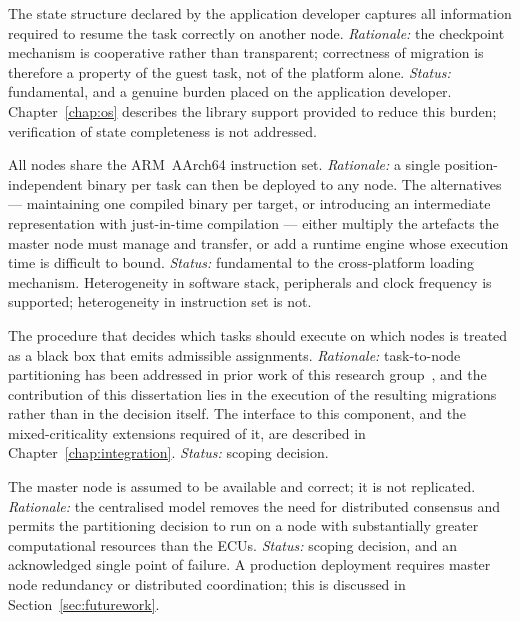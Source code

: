 \begin{description}
	The state structure declared by the application developer captures all
	information required to resume the task correctly on another node.
	\emph{Rationale:} the checkpoint mechanism is cooperative rather than
	transparent; correctness of migration is therefore a property of the guest
	task, not of the platform alone.
	\emph{Status:} fundamental, and a genuine burden placed on the application
	developer. Chapter~\ref{chap:os} describes the library support provided to
	reduce this burden; verification of state completeness is not addressed.
	
	All nodes share the ARM~AArch64 instruction set.
	\emph{Rationale:} a single position-independent binary per task can then be
	deployed to any node. The alternatives --- maintaining one compiled binary
	per target, or introducing an intermediate representation with
	just-in-time compilation --- either multiply the artefacts the
	master node must manage and transfer, or add a runtime engine whose
	execution time is difficult to bound.
	\emph{Status:} fundamental to the cross-platform loading mechanism.
	Heterogeneity in software stack, peripherals and clock frequency is
	supported; heterogeneity in instruction set is not.
	
	The procedure that decides which tasks should execute on which nodes is
	treated as a black box that emits admissible assignments.
	\emph{Rationale:} task-to-node partitioning has been addressed in prior
	work of this research group~\parencite{delgadillo_jlpea22, blieninger1},
	and the contribution of this dissertation lies in the execution of the
	resulting migrations rather than in the decision itself. The interface to
	this component, and the mixed-criticality extensions required of it, are
	described in Chapter~\ref{chap:integration}.
	\emph{Status:} scoping decision.
	
	The master node is assumed to be available and correct; it is not
	replicated.
	\emph{Rationale:} the centralised model removes the need for distributed
	consensus and permits the partitioning decision to run on a node with
	substantially greater computational resources than the ECUs.
	\emph{Status:} scoping decision, and an acknowledged single point of
	failure. A production deployment requires master node redundancy or
	distributed coordination; this is discussed in
	Section~\ref{sec:futurework}.
	

\end{description}
